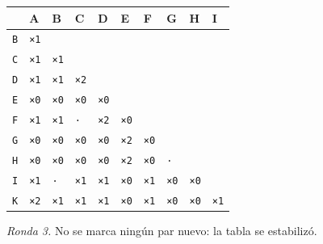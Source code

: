 \documentclass[11pt]{article}
\begin{document}
\begin{center}\footnotesize\begin{tabular}{llllllllll}\toprule
 & A & B & C & D & E & F & G & H & I \\\midrule
\texttt{B} & \texttt{×1} & \texttt{} & \texttt{} & \texttt{} & \texttt{} & \texttt{} & \texttt{} & \texttt{} & \texttt{} \\
\texttt{C} & \texttt{×1} & \texttt{×1} & \texttt{} & \texttt{} & \texttt{} & \texttt{} & \texttt{} & \texttt{} & \texttt{} \\
\texttt{D} & \texttt{×1} & \texttt{×1} & \texttt{×2} & \texttt{} & \texttt{} & \texttt{} & \texttt{} & \texttt{} & \texttt{} \\
\texttt{E} & \texttt{×0} & \texttt{×0} & \texttt{×0} & \texttt{×0} & \texttt{} & \texttt{} & \texttt{} & \texttt{} & \texttt{} \\
\texttt{F} & \texttt{×1} & \texttt{×1} & \texttt{·} & \texttt{×2} & \texttt{×0} & \texttt{} & \texttt{} & \texttt{} & \texttt{} \\
\texttt{G} & \texttt{×0} & \texttt{×0} & \texttt{×0} & \texttt{×0} & \texttt{×2} & \texttt{×0} & \texttt{} & \texttt{} & \texttt{} \\
\texttt{H} & \texttt{×0} & \texttt{×0} & \texttt{×0} & \texttt{×0} & \texttt{×2} & \texttt{×0} & \texttt{·} & \texttt{} & \texttt{} \\
\texttt{I} & \texttt{×1} & \texttt{·} & \texttt{×1} & \texttt{×1} & \texttt{×0} & \texttt{×1} & \texttt{×0} & \texttt{×0} & \texttt{} \\
\texttt{K} & \texttt{×2} & \texttt{×1} & \texttt{×1} & \texttt{×1} & \texttt{×0} & \texttt{×1} & \texttt{×0} & \texttt{×0} & \texttt{×1} \\
\bottomrule\end{tabular}\end{center}
\textit{Ronda 3.} No se marca ningún par nuevo: la tabla se estabilizó.
\end{document}
